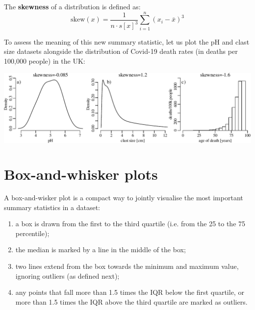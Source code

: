 The \textbf{skewness} of a distribution is defined as:
\begin{equation}
  \mbox{skew}(x) = \frac{1}{n \cdot s[x]^3}\sum\limits_{i=1}^{n}(x_i-\bar{x})^3
  \label{eq:skew}
\end{equation}

To assess the meaning of this new summary statistic, let us plot the
pH and clast size datasets alongside the distribution of Covid-19
death rates (in deaths per 100,000 people) in the UK:\medskip

\noindent\includegraphics[width=\textwidth]{../figures/skewness.pdf}
\begingroup
\endgroup

\section{Box-and-whisker plots}
\label{sec:boxplots}

A box-and-wisker plot is a compact way to jointly visualise the most
important summary statistics in a dataset:

\begin{enumerate}
\item a box is drawn from the first to the third quartile (i.e. from
  the 25 to the 75 percentile);
\item the median is marked by a line in the middle of the box;
\item two lines extend from the box towards the minimum and maximum
  value, ignoring outliers (as defined next);
\item any points that fall more than 1.5 times the IQR below the first
  quartile, or more than 1.5 times the IQR above the third quartile
  are marked as outliers.
\end{enumerate}


